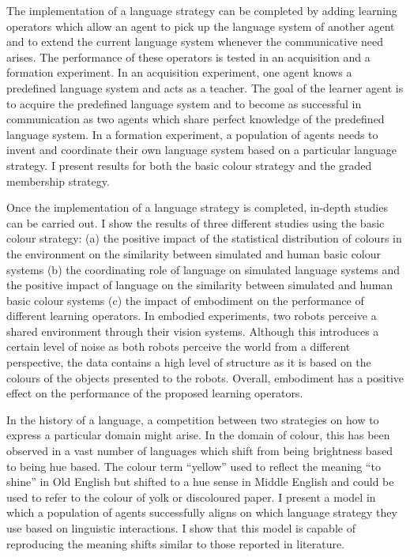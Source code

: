 The implementation of a language strategy can be completed by adding
learning operators which allow an agent to pick up the language system
of another agent and to extend the current language system whenever
the communicative need arises. The performance of these operators is
tested in an acquisition and a formation experiment. In an acquisition
experiment, one agent knows a predefined language system and acts as a
teacher. The goal of the learner agent is to acquire the predefined
language system and to become as successful in communication as two
agents which share perfect knowledge of the predefined language
system. In a formation experiment, a population of agents needs to
invent and coordinate their own language system based on a particular
language strategy. I present results for both the basic colour
strategy and the graded membership strategy.

Once the implementation of a language strategy is completed, in-depth
studies can be carried out. I show the results of three different
studies using the basic colour strategy: (a) the positive impact of
the statistical distribution of colours in the environment on the
similarity between simulated and human basic colour systems (b) the
coordinating role of language on simulated language systems and the
positive impact of language on the similarity between simulated and
human basic colour systems (c) the impact of embodiment on the
performance of different learning operators. In embodied experiments,
two robots perceive a shared environment through their vision
systems. Although this introduces a certain level of noise as both
robots perceive the world from a different perspective, the data
contains a high level of structure as it is based on the colours of
the objects presented to the robots. Overall, embodiment has a
positive effect on the performance of the proposed learning operators.

In the history of a language, a competition between two strategies on
how to express a particular domain might arise. In the domain of
colour, this has been observed in a vast number of languages which
shift from being brightness based to being hue based. The colour term
``yellow'' used to reflect the meaning ``to shine'' in Old English but
shifted to a hue sense in Middle English and could be used to refer to
the colour of yolk or discoloured paper. I present a model in which a
population of agents successfully aligns on which language strategy
they use based on linguistic interactions. I show that this model is
capable of reproducing the meaning shifts similar to those reported in
literature.

